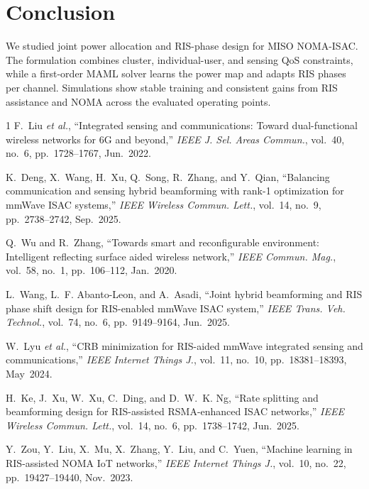 \documentclass[10pt,journal]{IEEEtran}
\begin{document}
\section{Conclusion}
We studied joint power allocation and RIS-phase design for MISO NOMA-ISAC.
The formulation combines cluster, individual-user, and sensing QoS constraints,
while a first-order MAML solver learns the power map and adapts RIS phases per
channel. Simulations show stable training and consistent gains from RIS
assistance and NOMA across the evaluated operating points.

\begin{thebibliography}{1}
F.~Liu \emph{et al.}, ``Integrated sensing and communications: Toward
dual-functional wireless networks for 6G and beyond,''
\emph{IEEE J. Sel. Areas Commun.}, vol.~40, no.~6, pp.~1728--1767, Jun.~2022.

K.~Deng, X.~Wang, H.~Xu, Q.~Song, R.~Zhang, and Y.~Qian, ``Balancing
communication and sensing hybrid beamforming with rank-1 optimization for
mmWave ISAC systems,'' \emph{IEEE Wireless Commun. Lett.}, vol.~14, no.~9,
pp.~2738--2742, Sep.~2025.

Q.~Wu and R.~Zhang, ``Towards smart and reconfigurable environment: Intelligent
reflecting surface aided wireless network,'' \emph{IEEE Commun. Mag.}, vol.~58,
no.~1, pp.~106--112, Jan.~2020.

L.~Wang, L.~F. Abanto-Leon, and A.~Asadi, ``Joint hybrid beamforming and RIS
phase shift design for RIS-enabled mmWave ISAC system,'' \emph{IEEE Trans. Veh.
Technol.}, vol.~74, no.~6, pp.~9149--9164, Jun.~2025.

W.~Lyu \emph{et al.}, ``CRB minimization for RIS-aided mmWave integrated sensing
and communications,'' \emph{IEEE Internet Things J.}, vol.~11, no.~10,
pp.~18381--18393, May~2024.

H.~Ke, J.~Xu, W.~Xu, C.~Ding, and D.~W.~K. Ng, ``Rate splitting and beamforming
design for RIS-assisted RSMA-enhanced ISAC networks,'' \emph{IEEE Wireless
Commun. Lett.}, vol.~14, no.~6, pp.~1738--1742, Jun.~2025.

Y.~Zou, Y.~Liu, X.~Mu, X.~Zhang, Y.~Liu, and C.~Yuen, ``Machine learning in
RIS-assisted NOMA IoT networks,'' \emph{IEEE Internet Things J.}, vol.~10,
no.~22, pp.~19427--19440, Nov.~2023.


\end{thebibliography}
\end{document}
